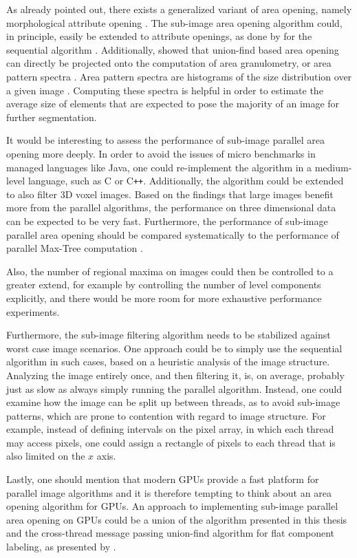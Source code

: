 As already pointed out, there exists a generalized variant of area opening,
namely morphological attribute opening \cite{Breen1996Attribute}. The sub-image
area opening algorithm could, in principle, easily be extended to attribute
openings, as done by \citet{Wilkinson2000Fast} for the sequential algorithm
\cite{Meijster2002Comparison}. Additionally, \citet{Meijster2001Fast} showed
that union-find based area opening can directly be projected onto the
computation of area granulometry, or area pattern spectra
\cite{Meijster2002Comparison}. Area pattern spectra are histograms of the size
distribution over a given image \cite{MohanaRao2001Areagranulometry}. Computing
these spectra is helpful in order to estimate the average size of elements that
are expected to pose the majority of an image for further segmentation.

It would be interesting to assess the performance of sub-image parallel area
opening more deeply. In order to avoid the issues of micro benchmarks in managed
languages like Java, one could re-implement the algorithm in a medium-level
language, such as C or C{}\verb!++!. Additionally, the algorithm could be
extended to also filter 3D voxel images. Based on the findings that large images
benefit more from the parallel algorithms, the performance on three dimensional
data can be expected to be very fast. Furthermore, the performance of sub-image
parallel area opening should be compared systematically to the performance of
parallel Max-Tree computation \cite{Wilkinson2008Concurrent}.

Also, the number of regional maxima on images could then be controlled to a
greater extend, for example by controlling the number of level components
explicitly, and there would be more room for more exhaustive performance
experiments.

Furthermore, the sub-image filtering algorithm needs to be stabilized against
worst case image scenarios. One approach could be to simply use the sequential
algorithm in such cases, based on a heuristic analysis of the image
structure. Analyzing the image entirely once, and then filtering it, is, on
average, probably just as slow as always simply running the parallel
algorithm. Instead, one could examine how the image can be split up between
threads, as to avoid sub-image patterns, which are prone to contention with
regard to image structure. For example, instead of defining intervals on the
pixel array, in which each thread may access pixels, one could assign a
rectangle of pixels to each thread that is also limited on the $x$ axis.

Lastly, one should mention that modern GPUs provide a fast platform for parallel
image algorithms and it is therefore tempting to think about an area opening
algorithm for GPUs. An approach to implementing sub-image parallel area opening
on GPUs could be a union of the algorithm presented in this thesis and the
cross-thread message passing union-find algorithm for flat component labeling,
as presented by \citet{Hesselink2001Concurrent}.


